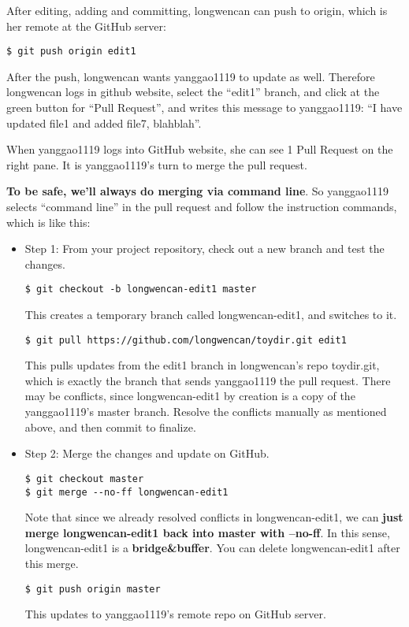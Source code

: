 \documentclass{article} %
\newcommand{\q}[1]{``#1''}
\begin{document}
After editing, adding and committing, longwencan can push to origin, which is her remote at the GitHub server:

\begin{lstlisting}
$ git push origin edit1
\end{lstlisting}

After the push, longwencan wants yanggao1119 to update as well. Therefore longwencan logs in github website, select the \q{edit1} branch, and click at the green button for \q{Pull Request}, and writes this message to yanggao1119: \q{I have updated file1 and added file7, blahblah}. 

When yanggao1119 logs into GitHub website, she can see 1 Pull Request on the right pane. It is yanggao1119's turn to merge the pull request. 

\textbf{To be safe, we'll always do merging via command line}. So yanggao1119 selects \q{command line} in the pull request and follow the instruction commands, which is like this:

\begin{itemize}

	\item Step 1: From your project repository, check out a new branch and test the changes.

\begin{lstlisting}
$ git checkout -b longwencan-edit1 master
\end{lstlisting}

This creates a temporary branch called longwencan-edit1, and switches to it.

\begin{lstlisting}
$ git pull https://github.com/longwencan/toydir.git edit1
\end{lstlisting}

This pulls updates from the edit1 branch in longwencan's repo toydir.git, which is exactly the branch that sends yanggao1119 the pull request. There may be conflicts, since longwencan-edit1 by creation is a copy of the yanggao1119's master branch. Resolve the conflicts manually as mentioned above, and then commit to finalize.


	\item Step 2: Merge the changes and update on GitHub.

\begin{lstlisting}
$ git checkout master
$ git merge --no-ff longwencan-edit1
\end{lstlisting}

Note that since we already resolved conflicts in longwencan-edit1, we can \textbf{just merge longwencan-edit1 back into master with --no-ff}. In this sense, longwencan-edit1 is a \textbf{bridge\&buffer}. You can delete longwencan-edit1 after this merge.

\begin{lstlisting}
$ git push origin master
\end{lstlisting}
This updates to yanggao1119's remote repo on GitHub server.

\end{itemize}
\end{document}
